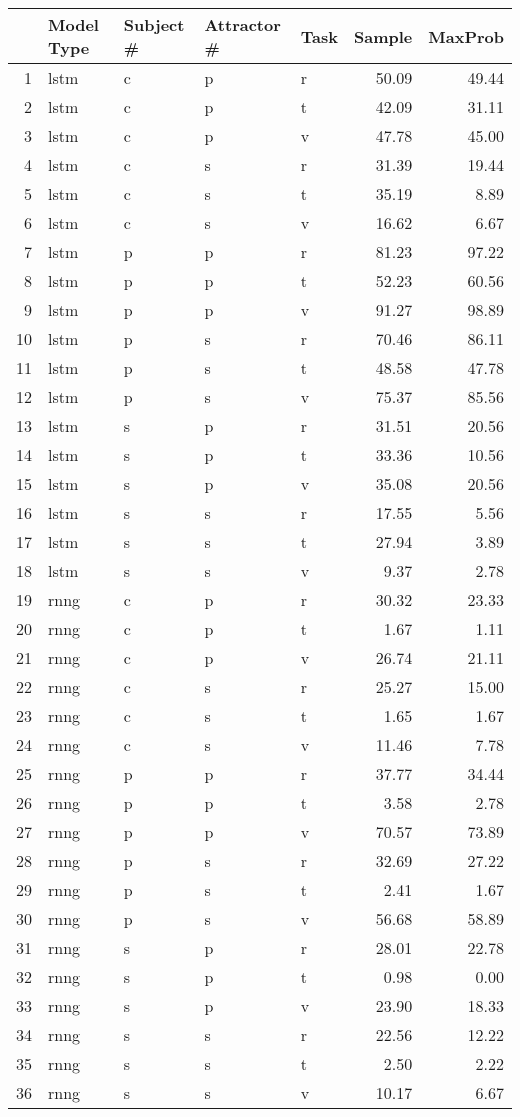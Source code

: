 \begin{tabular}{rllllrr}
  \hline
 & Model Type & Subject \# & Attractor \# & Task & Sample & MaxProb \\ 
  \hline
1 & lstm & c & p & r & 50.09 & 49.44 \\ 
  2 & lstm & c & p & t & 42.09 & 31.11 \\ 
  3 & lstm & c & p & v & 47.78 & 45.00 \\ 
  4 & lstm & c & s & r & 31.39 & 19.44 \\ 
  5 & lstm & c & s & t & 35.19 & 8.89 \\ 
  6 & lstm & c & s & v & 16.62 & 6.67 \\ 
  7 & lstm & p & p & r & 81.23 & 97.22 \\ 
  8 & lstm & p & p & t & 52.23 & 60.56 \\ 
  9 & lstm & p & p & v & 91.27 & 98.89 \\ 
  10 & lstm & p & s & r & 70.46 & 86.11 \\ 
  11 & lstm & p & s & t & 48.58 & 47.78 \\ 
  12 & lstm & p & s & v & 75.37 & 85.56 \\ 
  13 & lstm & s & p & r & 31.51 & 20.56 \\ 
  14 & lstm & s & p & t & 33.36 & 10.56 \\ 
  15 & lstm & s & p & v & 35.08 & 20.56 \\ 
  16 & lstm & s & s & r & 17.55 & 5.56 \\ 
  17 & lstm & s & s & t & 27.94 & 3.89 \\ 
  18 & lstm & s & s & v & 9.37 & 2.78 \\ 
  19 & rnng & c & p & r & 30.32 & 23.33 \\ 
  20 & rnng & c & p & t & 1.67 & 1.11 \\ 
  21 & rnng & c & p & v & 26.74 & 21.11 \\ 
  22 & rnng & c & s & r & 25.27 & 15.00 \\ 
  23 & rnng & c & s & t & 1.65 & 1.67 \\ 
  24 & rnng & c & s & v & 11.46 & 7.78 \\ 
  25 & rnng & p & p & r & 37.77 & 34.44 \\ 
  26 & rnng & p & p & t & 3.58 & 2.78 \\ 
  27 & rnng & p & p & v & 70.57 & 73.89 \\ 
  28 & rnng & p & s & r & 32.69 & 27.22 \\ 
  29 & rnng & p & s & t & 2.41 & 1.67 \\ 
  30 & rnng & p & s & v & 56.68 & 58.89 \\ 
  31 & rnng & s & p & r & 28.01 & 22.78 \\ 
  32 & rnng & s & p & t & 0.98 & 0.00 \\ 
  33 & rnng & s & p & v & 23.90 & 18.33 \\ 
  34 & rnng & s & s & r & 22.56 & 12.22 \\ 
  35 & rnng & s & s & t & 2.50 & 2.22 \\ 
  36 & rnng & s & s & v & 10.17 & 6.67 \\ 
   \hline
\end{tabular}
